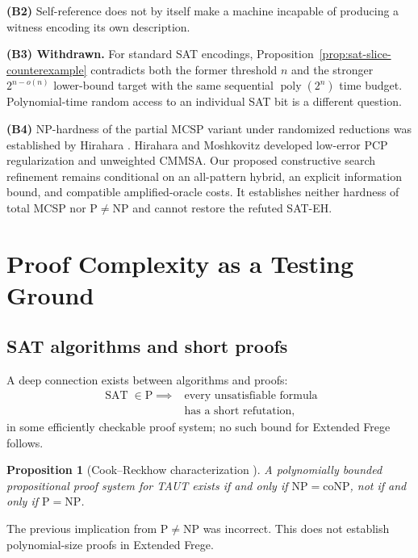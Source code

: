 \documentclass[aps,prd,twocolumn,superscriptaddress,nofootinbib]{revtex4-2}
\newtheorem{proposition}[theorem]{Proposition}
\theoremstyle{definition}
\theoremstyle{remark}
\DeclareMathOperator{\poly}{poly}
\DeclareMathOperator{\SAT}{SAT}
\newcommand{\NP}{\mathrm{NP}}
\newcommand{\PP}{\mathrm{P}}
\newcommand{\coNP}{\mathrm{coNP}}
\begin{document}
\textbf{(B2)} Self-reference does not by itself make a machine
incapable of producing a witness encoding its own description.

\textbf{(B3) Withdrawn.} For standard SAT encodings,
Proposition~\ref{prop:sat-slice-counterexample} contradicts
both the former threshold $n$ and the stronger
$2^{n-o(n)}$ lower-bound target with the same
sequential $\poly(2^n)$ time budget. Polynomial-time
random access to an individual SAT bit is a different question.

\textbf{(B4)} NP-hardness of the partial MCSP variant under
randomized reductions was established by Hirahara
\cite{Hirahara2022PartialMCSP}. Hirahara and Moshkovitz
\cite{HiraharaMoshkovitz2023} developed low-error PCP
regularization and unweighted CMMSA. Our proposed constructive
search refinement remains conditional on an all-pattern
hybrid, an explicit information bound, and compatible
amplified-oracle costs. It establishes neither hardness of
total MCSP nor $\PP\ne\NP$ and cannot restore the refuted SAT-EH.

\section{Proof Complexity as a Testing Ground}
\label{sec:proof_complexity}

\subsection{SAT algorithms and short proofs}

A deep connection exists between algorithms and proofs:
\begin{equation}
\begin{aligned}
\SAT \in \PP
\implies{}& \text{every unsatisfiable formula}\\
& \text{has a short refutation,}
\end{aligned}
\end{equation}
in some efficiently checkable proof system; no such bound for Extended Frege follows.

\begin{proposition}[Cook--Reckhow characterization {\cite{CookReckhow1979}}]
\label{prop:proof_complexity}
A polynomially bounded propositional proof system for TAUT exists
if and only if $\NP=\coNP$, not if and only if $\PP=\NP$.
\end{proposition}
The previous implication from $\PP\ne\NP$ was incorrect. This does
not establish polynomial-size proofs in Extended Frege.
\end{document}

